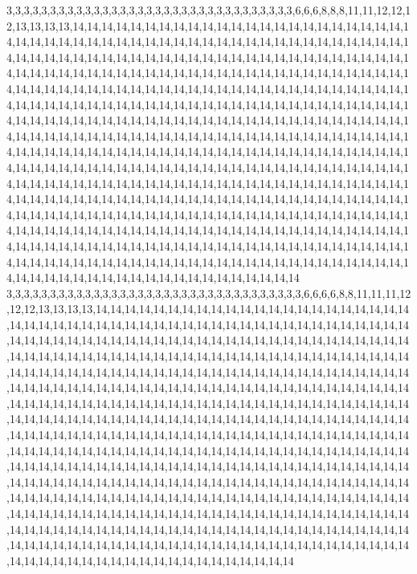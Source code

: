 3,3,3,3,3,3,3,3,3,3,3,3,3,3,3,3,3,3,3,3,3,3,3,3,3,3,3,3,3,3,3,3,3,6,6,6,8,8,8,11,11,12,12,12,13,13,13,13,14,14,14,14,14,14,14,14,14,14,14,14,14,14,14,14,14,14,14,14,14,14,14,14,14,14,14,14,14,14,14,14,14,14,14,14,14,14,14,14,14,14,14,14,14,14,14,14,14,14,14,14,14,14,14,14,14,14,14,14,14,14,14,14,14,14,14,14,14,14,14,14,14,14,14,14,14,14,14,14,14,14,14,14,14,14,14,14,14,14,14,14,14,14,14,14,14,14,14,14,14,14,14,14,14,14,14,14,14,14,14,14,14,14,14,14,14,14,14,14,14,14,14,14,14,14,14,14,14,14,14,14,14,14,14,14,14,14,14,14,14,14,14,14,14,14,14,14,14,14,14,14,14,14,14,14,14,14,14,14,14,14,14,14,14,14,14,14,14,14,14,14,14,14,14,14,14,14,14,14,14,14,14,14,14,14,14,14,14,14,14,14,14,14,14,14,14,14,14,14,14,14,14,14,14,14,14,14,14,14,14,14,14,14,14,14,14,14,14,14,14,14,14,14,14,14,14,14,14,14,14,14,14,14,14,14,14,14,14,14,14,14,14,14,14,14,14,14,14,14,14,14,14,14,14,14,14,14,14,14,14,14,14,14,14,14,14,14,14,14,14,14,14,14,14,14,14,14,14,14,14,14,14,14,14,14,14,14,14,14,14,14,14,14,14,14,14,14,14,14,14,14,14,14,14,14,14,14,14,14,14,14,14,14,14,14,14,14,14,14,14,14,14,14,14,14,14,14,14,14,14,14,14,14,14,14,14,14,14,14,14,14,14,14,14,14,14,14,14,14,14,14,14,14,14,14,14,14,14,14,14,14,14,14,14,14,14,14,14,14,14,14,14,14,14,14,14,14,14,14,14,14,14,14,14,14,14,14,14,14,14,14,14,14,14,14,14,14,14,14,14,14,14,14,14,14,14,14,14,14,14,14,14,14,14,14,14,14,14,14,14,14,14,14,14,14,14,14,14,14,14,14,14,14,14,14,14,14,14,14,14,14,14,14,14,14,14,14,14,14,14,14,14,14,14,14,14,14,14,14,14,14,14,14
3,3,3,3,3,3,3,3,3,3,3,3,3,3,3,3,3,3,3,3,3,3,3,3,3,3,3,3,3,3,3,3,3,3,6,6,6,6,8,8,11,11,11,12,12,12,13,13,13,13,14,14,14,14,14,14,14,14,14,14,14,14,14,14,14,14,14,14,14,14,14,14,14,14,14,14,14,14,14,14,14,14,14,14,14,14,14,14,14,14,14,14,14,14,14,14,14,14,14,14,14,14,14,14,14,14,14,14,14,14,14,14,14,14,14,14,14,14,14,14,14,14,14,14,14,14,14,14,14,14,14,14,14,14,14,14,14,14,14,14,14,14,14,14,14,14,14,14,14,14,14,14,14,14,14,14,14,14,14,14,14,14,14,14,14,14,14,14,14,14,14,14,14,14,14,14,14,14,14,14,14,14,14,14,14,14,14,14,14,14,14,14,14,14,14,14,14,14,14,14,14,14,14,14,14,14,14,14,14,14,14,14,14,14,14,14,14,14,14,14,14,14,14,14,14,14,14,14,14,14,14,14,14,14,14,14,14,14,14,14,14,14,14,14,14,14,14,14,14,14,14,14,14,14,14,14,14,14,14,14,14,14,14,14,14,14,14,14,14,14,14,14,14,14,14,14,14,14,14,14,14,14,14,14,14,14,14,14,14,14,14,14,14,14,14,14,14,14,14,14,14,14,14,14,14,14,14,14,14,14,14,14,14,14,14,14,14,14,14,14,14,14,14,14,14,14,14,14,14,14,14,14,14,14,14,14,14,14,14,14,14,14,14,14,14,14,14,14,14,14,14,14,14,14,14,14,14,14,14,14,14,14,14,14,14,14,14,14,14,14,14,14,14,14,14,14,14,14,14,14,14,14,14,14,14,14,14,14,14,14,14,14,14,14,14,14,14,14,14,14,14,14,14,14,14,14,14,14,14,14,14,14,14,14,14,14,14,14,14,14,14,14,14,14,14,14,14,14,14,14,14,14,14,14,14,14,14,14,14,14,14,14,14,14,14,14,14,14,14,14,14,14,14,14,14,14,14,14,14,14,14,14,14,14,14,14,14,14,14,14,14,14,14,14,14,14,14,14,14,14,14,14,14,14,14,14,14,14,14,14,14,14,14,14,14,14,14,14,14,14,14,14,14,14,14,14,14,14,14,14,14,14
